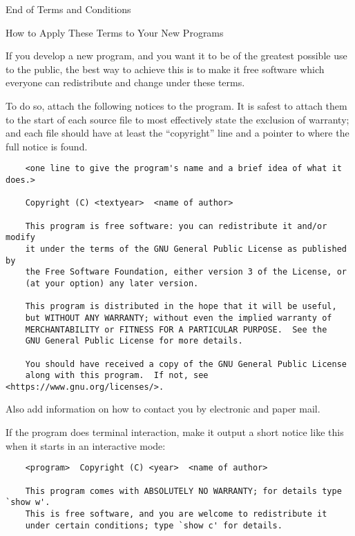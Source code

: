 \documentclass{article}
\begin{document}
\begin{enumerate}
    \begin{center}
    {\Large\sc End of Terms and Conditions}
    
    \bigskip
    How to Apply These Terms to Your New Programs
    \end{center}
    
    If you develop a new program, and you want it to be of the greatest
    possible use to the public, the best way to achieve this is to make it
    free software which everyone can redistribute and change under these terms.
    
    To do so, attach the following notices to the program.  It is safest
    to attach them to the start of each source file to most effectively
    state the exclusion of warranty; and each file should have at least
    the ``copyright'' line and a pointer to where the full notice is found.
    
    {\footnotesize
    \begin{verbatim}
    <one line to give the program's name and a brief idea of what it does.>
    
    Copyright (C) <textyear>  <name of author>
    
    This program is free software: you can redistribute it and/or modify
    it under the terms of the GNU General Public License as published by
    the Free Software Foundation, either version 3 of the License, or
    (at your option) any later version.
    
    This program is distributed in the hope that it will be useful,
    but WITHOUT ANY WARRANTY; without even the implied warranty of
    MERCHANTABILITY or FITNESS FOR A PARTICULAR PURPOSE.  See the
    GNU General Public License for more details.
    
    You should have received a copy of the GNU General Public License
    along with this program.  If not, see <https://www.gnu.org/licenses/>.
    \end{verbatim}
    }
    
    Also add information on how to contact you by electronic and paper mail.
    
    If the program does terminal interaction, make it output a short
    notice like this when it starts in an interactive mode:
    
    {\footnotesize
    \begin{verbatim}
    <program>  Copyright (C) <year>  <name of author>
    
    This program comes with ABSOLUTELY NO WARRANTY; for details type `show w'.
    This is free software, and you are welcome to redistribute it
    under certain conditions; type `show c' for details.
    \end{verbatim}
    }
    

\end{enumerate}
\end{document}
